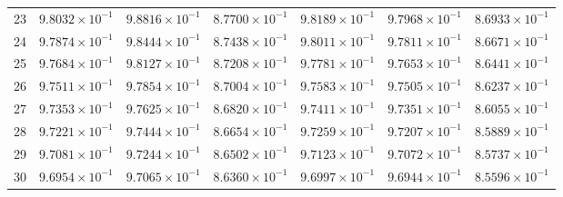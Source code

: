 \begin{table}[H]
\begin{tabular}{@{}rrrrrrr@{}}
23 & $9.8032\times10^{-1}$ & $9.8816\times10^{-1}$ & $8.7700\times10^{-1}$ & $9.8189\times10^{-1}$ & $9.7968\times10^{-1}$ & $8.6933\times10^{-1}$\\
24 & $9.7874\times10^{-1}$ & $9.8444\times10^{-1}$ & $8.7438\times10^{-1}$ & $9.8011\times10^{-1}$ & $9.7811\times10^{-1}$ & $8.6671\times10^{-1}$\\
25 & $9.7684\times10^{-1}$ & $9.8127\times10^{-1}$ & $8.7208\times10^{-1}$ & $9.7781\times10^{-1}$ & $9.7653\times10^{-1}$ & $8.6441\times10^{-1}$\\
26 & $9.7511\times10^{-1}$ & $9.7854\times10^{-1}$ & $8.7004\times10^{-1}$ & $9.7583\times10^{-1}$ & $9.7505\times10^{-1}$ & $8.6237\times10^{-1}$\\
27 & $9.7353\times10^{-1}$ & $9.7625\times10^{-1}$ & $8.6820\times10^{-1}$ & $9.7411\times10^{-1}$ & $9.7351\times10^{-1}$ & $8.6055\times10^{-1}$\\
28 & $9.7221\times10^{-1}$ & $9.7444\times10^{-1}$ & $8.6654\times10^{-1}$ & $9.7259\times10^{-1}$ & $9.7207\times10^{-1}$ & $8.5889\times10^{-1}$\\
29 & $9.7081\times10^{-1}$ & $9.7244\times10^{-1}$ & $8.6502\times10^{-1}$ & $9.7123\times10^{-1}$ & $9.7072\times10^{-1}$ & $8.5737\times10^{-1}$\\
30 & $9.6954\times10^{-1}$ & $9.7065\times10^{-1}$ & $8.6360\times10^{-1}$ & $9.6997\times10^{-1}$ & $9.6944\times10^{-1}$ & $8.5596\times10^{-1}$\\
\bottomrule
\end{tabular}
\end{table}

